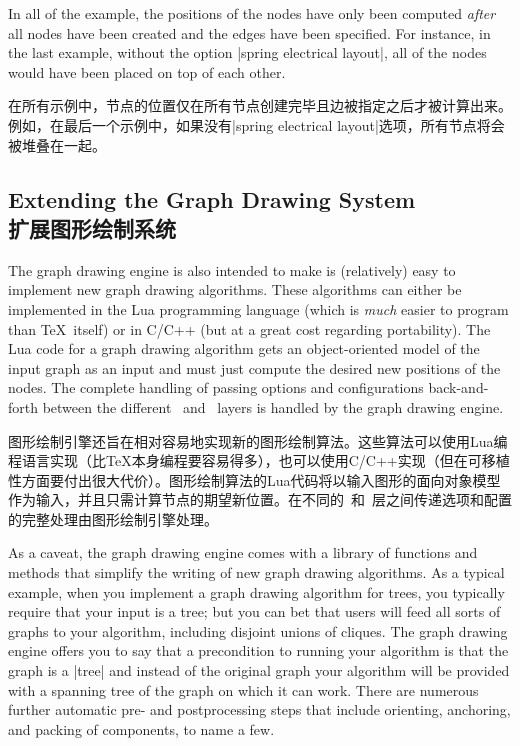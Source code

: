 In all of the example, the positions of the nodes have only been computed
\emph{after} all nodes have been created and the edges have been specified. For
instance, in the last example, without the option |spring electrical layout|,
all of the nodes would have been placed on top of each other.

在所有示例中，节点的位置仅在所有节点创建完毕且边被指定之后才被计算出来。例如，在最后一个示例中，如果没有|spring electrical layout|选项，所有节点将会被堆叠在一起。


\subsection{Extending the Graph Drawing System\\扩展图形绘制系统}

The graph drawing engine is also intended to make is (relatively) easy to
implement new graph drawing algorithms. These algorithms can either be
implemented in the Lua programming language (which is \emph{much} easier to
program than \TeX\ itself) or in C/C++ (but at a great cost regarding
portability). The Lua code for a graph drawing algorithm gets an
object-oriented model of the input graph as an input and must just compute the
desired new positions of the nodes. The complete handling of passing options
and configurations back-and-forth between the different \tikzname\ and
\pgfname\ layers is handled by the graph drawing engine.

图形绘制引擎还旨在相对容易地实现新的图形绘制算法。这些算法可以使用Lua编程语言实现（比\TeX 本身编程要容易得多），也可以使用C/C++实现（但在可移植性方面要付出很大代价）。图形绘制算法的Lua代码将以输入图形的面向对象模型作为输入，并且只需计算节点的期望新位置。在不同的\tikzname\ 和\pgfname\ 层之间传递选项和配置的完整处理由图形绘制引擎处理。

As a caveat, the graph drawing engine comes with a library of functions and
methods that simplify the writing of new graph drawing algorithms. As a typical
example, when you implement a graph drawing algorithm for trees, you typically
require that your input is a tree; but you can bet that users will feed all
sorts of graphs to your algorithm, including disjoint unions of cliques. The
graph drawing engine offers you to say that a precondition to running your
algorithm is that the graph is a |tree| and instead of the original graph your
algorithm will be provided with a spanning tree of the graph on which it can
work. There are numerous further automatic pre- and postprocessing steps that
include orienting, anchoring, and packing of components, to name a few.

